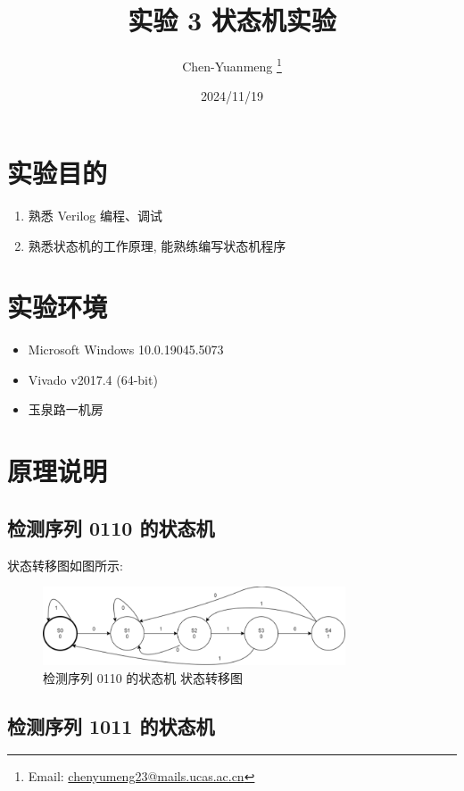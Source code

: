 \documentclass{article}
\title{实验 3 \quad 状态机实验}
\author{Chen-Yuanmeng \thanks{Email: \url{chenyumeng23@mails.ucas.ac.cn}}}
\date{2024/11/19}
\providecommand{\tightlist}{\setlength{\itemsep}{0pt}\setlength{\parskip}{0pt}}
\begin{document}
\maketitle

\section{实验目的}

\begin{enumerate}\tightlist
    \item 熟悉 Verilog 编程、调试
    \item 熟悉状态机的工作原理, 能熟练编写状态机程序
\end{enumerate}

\section{实验环境}

\begin{itemize}\tightlist
    \item Microsoft Windows 10.0.19045.5073
    \item Vivado v2017.4 (64-bit)
    \item 玉泉路一机房
\end{itemize}

\section{原理说明}

\subsection{检测序列 0110 的状态机}

状态转移图如图所示:

\begin{figure}[H]
    \centering
    \includegraphics[width=0.8\textwidth]{assets/graph_fsm_1.png}
    \caption{检测序列 0110 的状态机 状态转移图}
\end{figure}

\subsection{检测序列 1011 的状态机}
\end{document}
